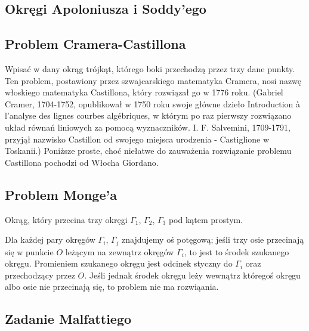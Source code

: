 \subsection{Okręgi Apoloniusza i Soddy'ego}


\subsection{Problem Cramera-Castillona}
Wpisać w dany okrąg trójkąt, którego boki przechodzą przez trzy dane punkty.
Ten problem, postawiony przez szwajcarskiego matematyka Cramera, nosi nazwę włoskiego matematyka Castillona, który rozwiązał go w 1776 roku.
(Gabriel Cramer, 1704-1752, opublikował w 1750 roku swoje główne dzieło Introduction à l’analyse des lignes courbes algébriques, w którym po raz pierwszy rozwiązano układ równań liniowych za pomocą wyznaczników.
I. F. Salvemini, 1709-1791, przyjął nazwisko Castillon od swojego miejsca urodzenia - Castiglione w Toskanii.)
Poniższe proste, choć niełatwe do zauważenia rozwiązanie problemu Castillona pochodzi od Włocha Giordano.

\subsection{Problem Monge'a}
\begin{problem}[Monge'a?]
    Okrąg, który przecina trzy okręgi $\Gamma_1$, $\Gamma_2$, $\Gamma_3$ pod kątem prostym.
\end{problem}

Dla każdej pary okręgów $\Gamma_i$, $\Gamma_j$ znajdujemy oś potęgową; jeśli trzy osie przecinają się w punkcie $O$ leżącym na zewnątrz okręgów $\Gamma_i$, to jest to środek szukanego okręgu.
Promieniem szukanego okręgu jest odcinek styczny do $\Gamma_i$ oraz przechodzący przez $O$.
Jeśli jednak środek okręgu leży wewnątrz któregoś okręgu albo osie nie przecinają się, to problem nie ma rozwiąania.

\subsection{Zadanie Malfattiego}


